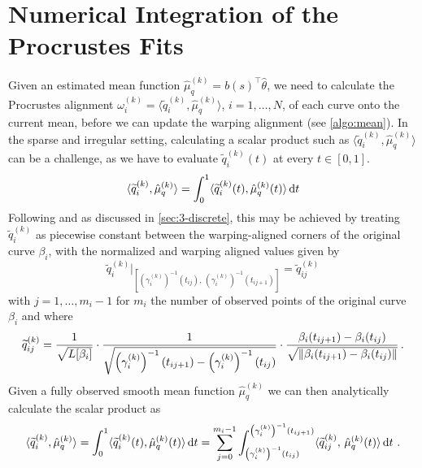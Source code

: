 \section{Numerical Integration of the Procrustes Fits}
\label{sec:3-pfits}
Given an estimated mean function $\hat\mu_q^{(k)} = b(s)^\top\hat\theta$, we need to calculate the Procrustes alignment $\omega_i^{(k)} = \langle \widetilde q_i^{(k)}, \hat\mu_q^{(k)} \rangle$, $i = 1,\dots,N$, of each curve onto the current mean, before we can update the warping alignment (see \cref{algo:mean}).
In the sparse and irregular setting, calculating a scalar product such as $\langle \widetilde q_i^{(k)}, \hat\mu_q^{(k)} \rangle$ can be a challenge, as we have to evaluate $\widetilde q_i^{(k)}(t)$ at every $t \in [0,1]$.
\begin{equation}
\langle \widetilde q_i^{(k)}, \hat\mu_q^{(k)} \rangle =
  \int_0^1 \langle \widetilde q_i^{(k)}(t), \hat\mu_q^{(k)}(t) \rangle \mathop{\mathrm{d}t}
\end{equation}
Following \cite{Steyer2021} and as discussed in \cref{sec:3-discrete}, this may be achieved by treating $\widetilde q_i^{(k)}$ as piecewise constant between the warping-aligned corners of the original curve $\beta_i$, with the normalized and warping aligned values given by
\begin{equation}
   \widetilde q_i^{(k)} \Big\rvert_{\left[\left(\gamma_i^{(k)}\right)^{-1}(t_{ij}),\, \left(\gamma_i^{(k)} \right)^{-1}(t_{ij+1})\right]} =
  \widetilde q_{ij}^{(k)}
\end{equation}
with $j = 1, \dots, m_i - 1$ for $m_i$ the number of observed points of the original curve $\beta_i$ and where
\begin{equation}
  \widetilde q_{ij}^{(k)} = 
  \frac{1}{\sqrt{L[\beta_i]}}\cdot \frac{1}{\sqrt{\left(\gamma_i^{(k)}\right)^{-1}(t_{ij+1}) - \left(\gamma_i^{(k)}\right)^{-1}(t_{ij})}} \cdot \frac{\beta_i(t_{ij+1}) - \beta_i(t_{ij})}{\sqrt{\lVert\beta_i(t_{ij+1}) - \beta_i(t_{ij})\rVert}} \,.
\end{equation}
Given a fully observed smooth mean function $\hat\mu_q^{(k)}$ we can then analytically calculate the scalar product as
\begin{equation}
\langle \widetilde q_i^{(k)}, \hat\mu_q^{(k)} \rangle =
  \int_0^1 \langle \widetilde q_i^{(k)}(t), \hat\mu_q^{(k)}(t) \rangle \mathop{\mathrm{d}t} =
  \sum_{j=0}^{m_i-1} \int_{\left(\gamma_i^{(k)}\right)^{-1}(t_{ij})}^{\left(\gamma_i^{(k)}\right)^{-1}(t_{ij+1})} \langle \widetilde q_{ij}^{(k)},\, \hat\mu_q^{(k)} (t) \rangle \mathop{\mathrm{d}t} \,.
\end{equation}

